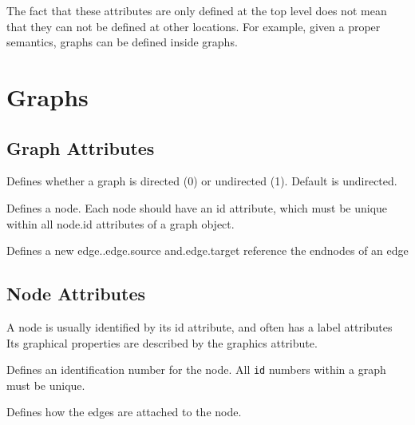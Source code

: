 The fact that these attributes are only defined at the top level
does not mean that they can not be defined at other locations.
For example, given a proper semantics, graphs can be defined
inside graphs.


%
%

\section{Graphs}
\label{s:GML:Graph}


%
%

\subsection{Graph Attributes}
\label{s:GML:GraphAttributes}

\begin{GMLAttributes}
  
   Defines whether a graph is directed
  (0) or undirected (1). Default is undirected.
  
   Defines a node. Each node should have
  an id attribute, which must be unique within all node.id
  attributes of a graph object.

  Defines a new edge..edge.source and.edge.target reference the
  endnodes of an edge

\end{GMLAttributes}


%
%

\subsection{Node Attributes}
\label{s:GML:NodeAttributes}

A node is usually identified by its id attribute, and often has a 
label attributes Its graphical properties are described by the 
graphics attribute.

\begin{GMLAttributes}

   Defines an identification number
  for the node. All \texttt{id} numbers within a graph must be
  unique.
  
   Defines how the edges are
  attached to the node.

\end{GMLAttributes}


